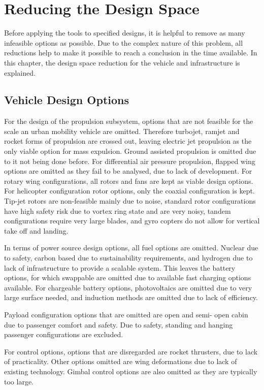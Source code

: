 \newpage
\chapter{Reducing the Design Space}
\label{ch-DS}

Before applying the tools to specified designs, it is helpful to remove as many infeasible options as possible. Due to the complex nature of this problem, all reductions help to make it possible to reach a conclusion in the time available. In this chapter, the design space reduction for the vehicle and infrastructure is explained.

\section{Vehicle Design Options}
For the design of the propulsion subsystem, options that are not feasible for the scale an urban mobility vehicle are omitted. Therefore turbojet, ramjet and rocket forms of propulsion are crossed out, leaving electric jet propulsion as the only viable option for mass expulsion. Ground assisted propulsion is omitted due to it not being done before. For differential air pressure propulsion, flapped wing options are omitted as they fail to be analysed, due to lack of development. For rotary wing configurations, all rotors and fans are kept as viable design options. For helicopter configuration rotor options, only the coaxial configuration is kept. Tip-jet rotors are non-feasible mainly due to noise, standard rotor configurations have high safety risk due to vortex ring state and are very noisy, tandem configurations require very large blades, and gyro copters do not allow for vertical take off and landing. 

In terms of power source design options, all fuel options are omitted. Nuclear due to safety, carbon based due to sustainability requirements, and hydrogen due to lack of infrastructure to provide a scalable system. This leaves the battery options, for which swappable are omitted due to available fast charging options available. For chargeable battery options, photovoltaics are omitted due to very large surface needed, and induction methods are omitted due to lack of efficiency.

Payload configuration options that are omitted are open and semi- open cabin due to passenger comfort and safety. Due to safety, standing and hanging passenger configurations are excluded.

For control options, options that are disregarded are rocket thrusters, due to lack of practicality. Other options omitted are wing deformations due to lack of existing technology. Gimbal control options are also omitted as they are typically too large. 

